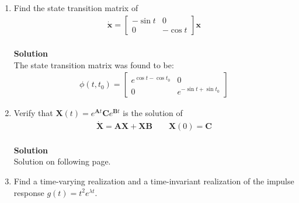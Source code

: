 \documentclass[11pt]{article}
\begin{document}
\begin{enumerate}
	\newpage
	\item{Find the state transition matrix of
		\begin{align*}
			\dot{\mathbf{x}}=\left[\begin{array}{cc}-\sin t & 0 \\0 & -\cos t\end{array}\right]\mathbf{x}
		\end{align*}
	\\
	
	\textbf{Solution}\\
	The state transition matrix was found to be:
	\begin{align*}
		\phi(t,t_0)=\left[\begin{array}{cc}e^{\cos t - \cos t_0} & 0 \\0 & e^{-\sin t + \sin t_0}\end{array}\right]
	\end{align*}
	}
	\newpage
	\item{Verify that $\mathbf{X}(t)=e^{\mathbf{A}t}\mathbf{C}e^{\mathbf{B}t}$ is the solution of
		\begin{align*}
			\dot{\mathbf{X}}=\mathbf{AX}+\mathbf{XB} \quad \quad \mathbf{X}(0)=\mathbf{C}
		\end{align*}
	\\
	
	\textbf{Solution}\\
	Solution on following page.
	}
	
	\newpage
	\item{Find a time-varying realization and a time-invariant realization of the impulse response $g(t)=t^2e^{\lambda t}$.
	\\
	
}
\end{enumerate}
\end{document}
